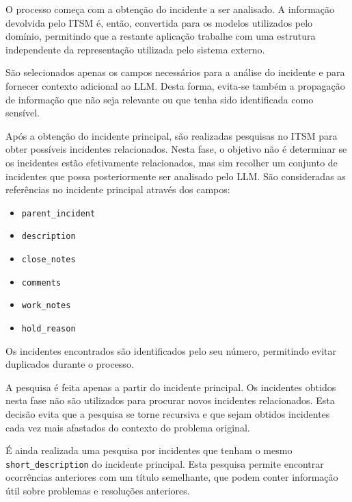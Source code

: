 		O processo começa com a obtenção do incidente a ser analisado. A informação devolvida pelo \gls{ITSM} é, então, convertida para os modelos utilizados pelo domínio, permitindo que a restante aplicação trabalhe com uma estrutura independente da representação utilizada pelo sistema externo.
		
		São selecionados apenas os campos necessários para a análise do incidente e para fornecer contexto adicional ao \gls{LLM}. Desta forma, evita-se também a propagação de informação que não seja relevante ou que tenha sido identificada como sensível.
		
		
		Após a obtenção do incidente principal, são realizadas pesquisas no \gls{ITSM} para obter possíveis incidentes relacionados. Nesta fase, o objetivo não é determinar se os incidentes estão efetivamente relacionados, mas sim recolher um conjunto de incidentes que possa posteriormente ser analisado pelo \gls{LLM}. São consideradas as referências no incidente principal através dos campos:
		
		\begin{itemize}
			\item \texttt{parent\_incident}
			\item \texttt{description}
			\item \texttt{close\_notes}
			\item \texttt{comments}
			\item \texttt{work\_notes}
			\item \texttt{hold\_reason}
		\end{itemize}
		
		Os incidentes encontrados são identificados pelo seu número, permitindo evitar duplicados durante o processo.
		
		A pesquisa é feita apenas a partir do incidente principal. Os incidentes obtidos nesta fase não são utilizados para procurar novos incidentes relacionados. Esta decisão evita que a pesquisa se torne recursiva e que sejam obtidos incidentes cada vez mais afastados do contexto do problema original.
		
		É ainda realizada uma pesquisa por incidentes que tenham o mesmo \texttt{short\_description} do incidente principal. Esta pesquisa permite encontrar ocorrências anteriores com um título semelhante, que podem conter informação útil sobre problemas e resoluções anteriores.
		
